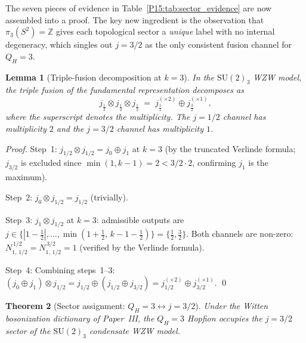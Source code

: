 \documentclass[11pt,a4paper]{article}
\newtheorem{theorem}{Theorem}[section]
\newtheorem{lemma}[theorem]{Lemma}
\theoremstyle{definition}\newtheorem{definition}[theorem]{Definition}
\theoremstyle{remark}
\newcommand{\QH}{Q_H}
\begin{document}
The seven pieces of evidence in Table~\ref{P15:tab:sector_evidence}
are now assembled into a proof.
The key new ingredient is the observation that
$\pi_3(S^2)=\mathbb{Z}$ gives each topological sector a
\emph{unique} label with no internal degeneracy,
which singles out $j=3/2$ as the only consistent
fusion channel for $\QH=3$.

\begin{lemma}[Triple-fusion decomposition at $k=3$]
\label{P15:lem:triple_fusion}
In the $\mathrm{SU}(2)_3$ WZW model, the triple fusion of the
fundamental representation decomposes as
\begin{equation}
  j_{\frac12}\otimes j_{\frac12}\otimes j_{\frac12}
  \;=\;
  j_{\frac12}^{(\times 2)} \oplus j_{\frac32}^{(\times 1)},
  \label{P15:eq:triple_fusion}
\end{equation}
where the superscript denotes the multiplicity.
The $j=1/2$ channel has multiplicity $2$ and the $j=3/2$ channel
has multiplicity $1$.
\end{lemma}

\begin{proof}
Step~1: $j_{1/2}\otimes j_{1/2} = j_0\oplus j_1$ at $k=3$
(by the truncated Verlinde formula; $j_{3/2}$ is excluded since
$\min(1,k-1) = 2 < 3/2 \cdot 2$, confirming $j_1$ is the maximum).

Step~2: $j_0\otimes j_{1/2} = j_{1/2}$ (trivially).

Step~3: $j_1\otimes j_{1/2}$ at $k=3$: admissible outputs are
$j\in\{|1-\tfrac12|,\ldots,\min(1+\tfrac12,\,k-1-\tfrac12)\}
= \{\tfrac12,\tfrac32\}$.
Both channels are non-zero: $N_{1,\,1/2}^{\,1/2}=N_{1,\,1/2}^{\,3/2}=1$
(verified by the Verlinde formula).

Step~4: Combining steps~1--3:
$(j_0\oplus j_1)\otimes j_{1/2}
= j_{1/2}\oplus(j_{1/2}\oplus j_{3/2})
= j_{1/2}^{(\times 2)}\oplus j_{3/2}^{(\times 1)}$.
\qed
\end{proof}

\begin{theorem}[Sector assignment: $\QH=3\leftrightarrow j=3/2$]
\label{P15:thm:sector_assignment}
Under the Witten bosonization dictionary of Paper~III,
the $\QH=3$ Hopfion occupies the $j=3/2$ sector of the
$\mathrm{SU}(2)_3$ condensate WZW model.
\end{theorem}
\end{document}
